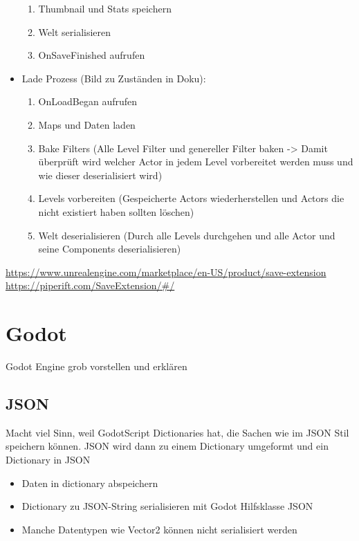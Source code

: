 \begin{itemize}
\begin{enumerate}
        \item Thumbnail und Stats speichern
        \item Welt serialisieren
        \item OnSaveFinished aufrufen
    \end{enumerate}
    \item Lade Prozess (Bild zu Zuständen in Doku):
    \begin{enumerate}
        \item OnLoadBegan aufrufen
        \item Maps und Daten laden
        \item Bake Filters (Alle Level Filter und genereller Filter baken -> Damit überprüft wird welcher Actor in jedem Level vorbereitet werden muss und wie dieser deserialisiert wird)
        \item Levels vorbereiten (Gespeicherte Actors wiederherstellen und Actors die nicht existiert haben sollten löschen)
        \item Welt deserialisieren (Durch alle Levels durchgehen und alle Actor und seine Components deserialisieren)
    \end{enumerate}
\end{itemize}

\url{https://www.unrealengine.com/marketplace/en-US/product/save-extension}\\
\url{https://piperift.com/SaveExtension/#/}


\section{Godot}
Godot Engine grob vorstellen und erklären

\subsection{JSON}
Macht viel Sinn, weil GodotScript Dictionaries hat, die Sachen wie im JSON Stil speichern 
können. JSON wird dann zu einem Dictionary umgeformt und ein Dictionary in JSON

\begin{itemize}
    \item Daten in dictionary abspeichern
    \item Dictionary zu JSON-String serialisieren mit Godot Hilfsklasse JSON
    \item Manche Datentypen wie Vector2 können nicht serialisiert werden
\end{itemize}

